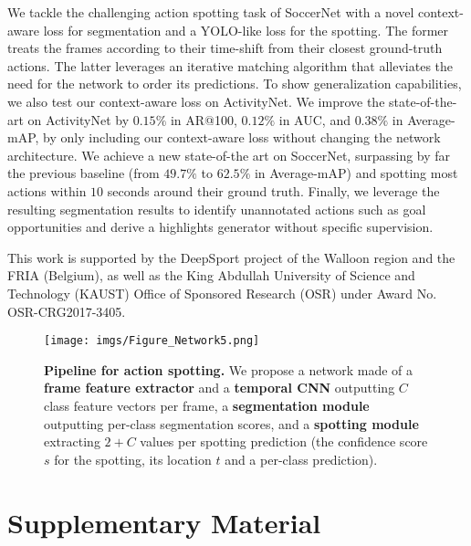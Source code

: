 \documentclass[10pt,twocolumn,letterpaper]{article}
\begin{document}
We tackle the challenging action spotting task of SoccerNet with a novel context-aware loss for segmentation and a YOLO-like loss for the spotting. The former treats the frames according to their time-shift from their closest ground-truth actions. The latter leverages an iterative matching algorithm that alleviates the need for the network to order its predictions. To show generalization capabilities, we also test our context-aware loss on ActivityNet. We improve the state-of-the-art on ActivityNet by $0.15\%$ in AR@100, $0.12\%$ in AUC, and $0.38\%$ in Average-mAP, by only including our context-aware loss without changing the network architecture. We achieve a new state-of-the art on SoccerNet, surpassing by far the previous baseline (from $49.7\%$ to $62.5\%$ in Average-mAP) and spotting most actions within $10$ seconds around their ground truth. Finally, we leverage the resulting segmentation results to identify unannotated actions such as goal opportunities and derive a highlights generator without specific supervision.


 This work is supported by the DeepSport project of the Walloon region and the FRIA (Belgium), as well as the King Abdullah University of Science and Technology (KAUST) Office of Sponsored Research (OSR) under Award No. OSR-CRG2017-3405. \clearpage


{\small


}

\clearpage

\begin{figure*}
    \centering
    \texttt{[image: imgs/Figure\_Network5.png]}
    \caption{
    \textbf{Pipeline for action spotting.}
    We propose a network made of
    a \textbf{\color{Orange}frame feature extractor} and a \textbf{\color{Orange} temporal CNN} outputting $C$ class feature vectors per frame,
    a \textbf{\color{NavyBlue}segmentation module} outputting per-class segmentation scores, and 
    a \textbf{\color{Green}spotting module} extracting $2+C$ values per spotting prediction (\ie the confidence score $s$ for the spotting, its location $t$ and a per-class prediction).
    }
    \label{fig:Network_Supp}
\end{figure*}



\section{Supplementary Material}
\end{document}
